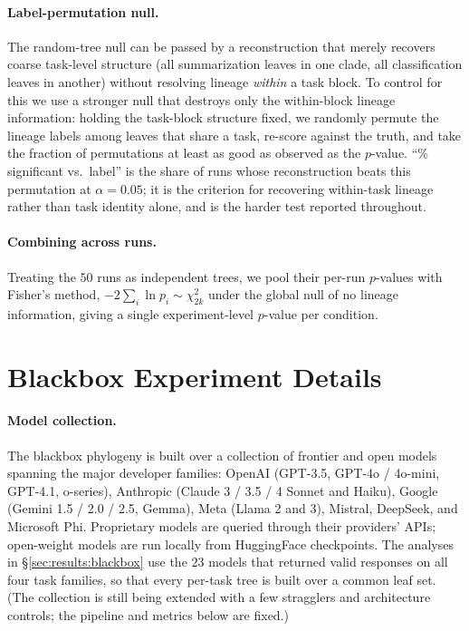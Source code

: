 \documentclass{article}
\theoremstyle{definition}
\theoremstyle{plain}
\begin{document}
\paragraph{Label-permutation null.} The random-tree null can be passed by a reconstruction that merely
recovers coarse task-level structure (all summarization leaves in one clade, all classification leaves
in another) without resolving lineage \emph{within} a task block. To control for this we use a stronger
null that destroys only the within-block lineage information: holding the task-block structure fixed, we
randomly permute the lineage labels among leaves that share a task, re-score against the truth, and take
the fraction of permutations at least as good as observed as the $p$-value. ``\% significant vs.\
label'' is the share of runs whose reconstruction beats this permutation at $\alpha=0.05$; it is the
criterion for recovering within-task lineage rather than task identity alone, and is the harder test
reported throughout.

\paragraph{Combining across runs.} Treating the $50$ runs as independent trees, we pool their per-run
$p$-values with Fisher's method, $-2\sum_{i}\ln p_i \sim \chi^2_{2k}$ under the global null of no lineage
information, giving a single experiment-level $p$-value per condition.

\section{Blackbox Experiment Details}
\label{app:blackbox}

\paragraph{Model collection.} The blackbox phylogeny is built over a collection of frontier and open
models spanning the major developer families: OpenAI (GPT-3.5, GPT-4o / 4o-mini, GPT-4.1, o-series),
Anthropic (Claude 3 / 3.5 / 4 Sonnet and Haiku), Google (Gemini 1.5 / 2.0 / 2.5, Gemma), Meta (Llama 2
and 3), Mistral, DeepSeek, and Microsoft Phi. Proprietary models are queried through their providers'
APIs; open-weight models are run locally from HuggingFace checkpoints. The analyses in
\S\ref{sec:results:blackbox} use the $23$ models that returned valid responses on all four task
families, so that every per-task tree is built over a common leaf set. (The collection is still being
extended with a few stragglers and architecture controls; the pipeline and metrics below are fixed.)
\end{document}
